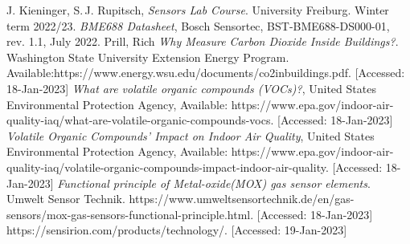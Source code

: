 \documentclass[DIV=14]{scrartcl}
\begin{document}
    \begin{thebibliography}{------}

         J. Kieninger, S.\,J. Rupitsch, \textit{Sensors Lab Course}.
        University Freiburg.
        Winter term 2022/23.
         \textit{BME688 Datasheet}, Bosch Sensortec, BST-BME688-DS000-01, rev. 1.1, July 2022.
         Prill, Rich \textit{Why Measure Carbon Dioxide Inside Buildings?}.
        Washington State University Extension Energy Program.
        Available:https://www.energy.wsu.edu/documents/co2inbuildings.pdf. [Accessed: 18-Jan-2023]
         \textit{What are volatile organic compounds (VOCs)?}, United States Environmental Protection Agency,
        Available: https://www.epa.gov/indoor-air-quality-iaq/what-are-volatile-organic-compounds-vocs. [Accessed: 18-Jan-2023]
         \textit{Volatile Organic Compounds' Impact on Indoor Air Quality}, United States Environmental Protection Agency,
        Available: https://www.epa.gov/indoor-air-quality-iaq/volatile-organic-compounds-impact-indoor-air-quality. [Accessed: 18-Jan-2023]
         \textit{Functional principle of Metal-oxide(MOX) gas sensor elements}. Umwelt Sensor Technik.
        https://www.umweltsensortechnik.de/en/gas-sensors/mox-gas-sensors-functional-principle.html. [Accessed: 18-Jan-2023]
         https://sensirion.com/products/technology/. [Accessed: 19-Jan-2023]
    \end{thebibliography}
\end{document}

